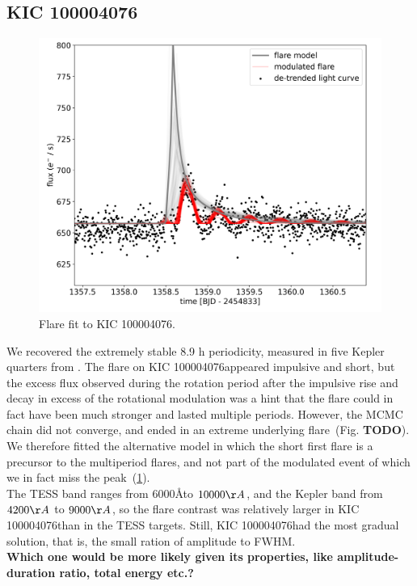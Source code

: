 \documentclass[fleqn,usenatbib,letters]{mnras}%
\newcommand{\FD}{EPIC 212035340} %
\newcommand{\FE}{KIC 100004076} %
\begin{document}
\subsection{\FE}
\begin{figure}
	\includegraphics[width=\columnwidth]{figures/04_08_2020_14_26_KIC100004076_flarefit_50retrievals.png}
    \caption{Flare fit to \FE.}
    \label{fig:fit\FE}
\end{figure}
We recovered the extremely stable 8.9 h periodicity, measured in five Kepler quarters from \citep{gizis2013}. The flare on \FE appeared impulsive and short, but the excess flux observed during the rotation period after the impulsive rise and decay in excess of the rotational modulation was a hint that the flare could in fact have been much stronger and lasted multiple periods. However, the MCMC chain did not converge, and ended in an extreme underlying flare~(Fig. \textbf{TODO}). We therefore fitted the alternative model in which the short first flare is a precursor to the multiperiod flares, and not part of the modulated event of which we in fact miss the peak~(\ref{fig:fit\FE}).
\\
The TESS band ranges from $6000$\AA to $10000\AA$, and the Kepler band from $4200\AA$ to $9000\AA$, so the flare contrast was relatively larger in \FE than in the TESS targets. Still, \FE had the most gradual solution, that is, the small ration of amplitude to FWHM.
\\
\textbf{Which one would be more likely given its properties, like amplitude-duration ratio, total energy etc.?}
\end{document}
